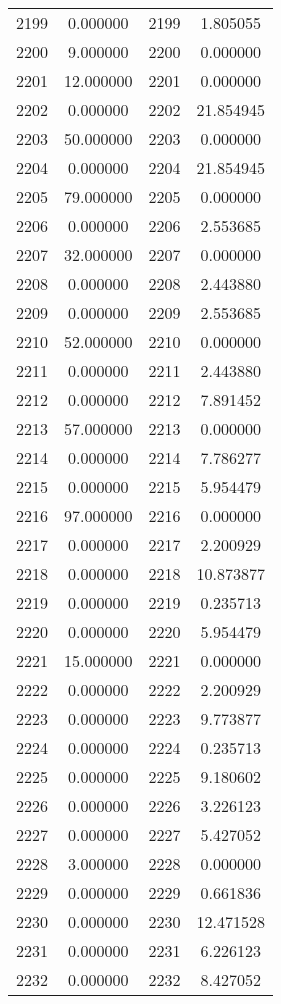 \documentclass[12pt]{article}
\begin{document}
\begin{longtable}{@{}cccc@{}}
2199 & 0.000000 & 2199 & 1.805055 \\
2200 & 9.000000 & 2200 & 0.000000 \\
2201 & 12.000000 & 2201 & 0.000000 \\
2202 & 0.000000 & 2202 & 21.854945 \\
2203 & 50.000000 & 2203 & 0.000000 \\
2204 & 0.000000 & 2204 & 21.854945 \\
2205 & 79.000000 & 2205 & 0.000000 \\
2206 & 0.000000 & 2206 & 2.553685 \\
2207 & 32.000000 & 2207 & 0.000000 \\
2208 & 0.000000 & 2208 & 2.443880 \\
2209 & 0.000000 & 2209 & 2.553685 \\
2210 & 52.000000 & 2210 & 0.000000 \\
2211 & 0.000000 & 2211 & 2.443880 \\
2212 & 0.000000 & 2212 & 7.891452 \\
2213 & 57.000000 & 2213 & 0.000000 \\
2214 & 0.000000 & 2214 & 7.786277 \\
2215 & 0.000000 & 2215 & 5.954479 \\
2216 & 97.000000 & 2216 & 0.000000 \\
2217 & 0.000000 & 2217 & 2.200929 \\
2218 & 0.000000 & 2218 & 10.873877 \\
2219 & 0.000000 & 2219 & 0.235713 \\
2220 & 0.000000 & 2220 & 5.954479 \\
2221 & 15.000000 & 2221 & 0.000000 \\
2222 & 0.000000 & 2222 & 2.200929 \\
2223 & 0.000000 & 2223 & 9.773877 \\
2224 & 0.000000 & 2224 & 0.235713 \\
2225 & 0.000000 & 2225 & 9.180602 \\
2226 & 0.000000 & 2226 & 3.226123 \\
2227 & 0.000000 & 2227 & 5.427052 \\
2228 & 3.000000 & 2228 & 0.000000 \\
2229 & 0.000000 & 2229 & 0.661836 \\
2230 & 0.000000 & 2230 & 12.471528 \\
2231 & 0.000000 & 2231 & 6.226123 \\
2232 & 0.000000 & 2232 & 8.427052 \\

\end{longtable}
\end{document}
